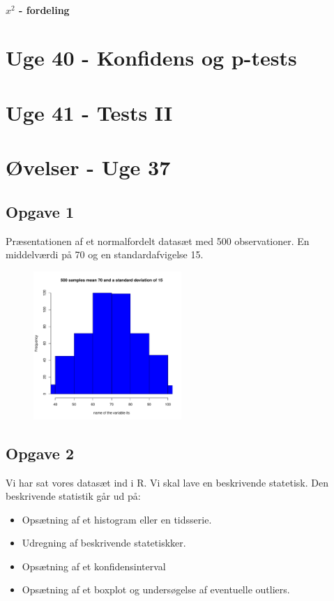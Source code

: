 \documentclass{article}
\begin{document}
\paragraph{$x^2$  - fordeling}

\newpage

\section{Uge 40 - Konfidens og p-tests}

\section{Uge 41 - Tests II}



\section{Øvelser - Uge 37}
\subsection{Opgave 1}
Præsentationen af et normalfordelt datasæt med 500 observationer. En middelværdi
på 70 og en standardafvigelse 15.
\begin{figure}[H] 
  \centering
  \includegraphics[width=0.5\textwidth]{../velser/uge37/R/plot.pdf}
\end{figure}

\subsection{Opgave 2}
Vi har sat vores datasæt ind i R. Vi skal lave en beskrivende statetisk. Den
beskrivende statistik går ud på:
\begin{itemize}
  \item Opsætning af et histogram eller en tidsserie.
  \item Udregning af beskrivende statetiskker.
  \item Opsætning af et konfidensinterval
  \item Opsætning af et boxplot og undersøgelse af eventuelle outliers.
\end{itemize}
\end{document}
